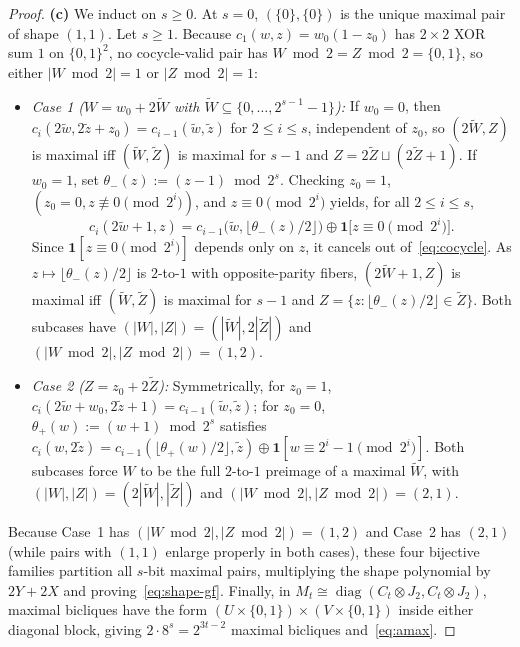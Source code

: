 \documentclass[11pt,reqno]{amsart}
\theoremstyle{definition}
\theoremstyle{remark}
\DeclareMathOperator{\diag}{diag}
\newcommand{\ind}{\mathbf{1}}
\numberwithin{equation}{section}
\begin{document}
\begin{proof}
\medskip
\noindent\textbf{(c)} We induct on $s \ge 0$. At $s = 0$, $(\{0\}, \{0\})$ is the unique maximal pair of shape $(1, 1)$. Let $s \ge 1$. Because $c_1(w, z) = w_0(1 - z_0)$ has $2 \times 2$ XOR sum $1$ on $\{0, 1\}^2$, no cocycle-valid pair has $W \bmod 2 = Z \bmod 2 = \{0, 1\}$, so either $|W \bmod 2| = 1$ or $|Z \bmod 2| = 1$:
\begin{itemize}[leftmargin=2em]
  \item \emph{Case 1 ($W = w_0 + 2\widetilde{W}$ with $\widetilde{W} \subseteq \{0, \dots, 2^{s-1} - 1\}$):}
  If $w_0 = 0$, then $c_i(2\tilde{w}, 2\tilde{z} + z_0) = c_{i-1}(\tilde{w}, \tilde{z})$ for $2 \le i \le s$, independent of $z_0$, so $(2\widetilde{W}, Z)$ is maximal iff $(\widetilde{W}, \widetilde{Z})$ is maximal for $s - 1$ and $Z = 2\widetilde{Z} \sqcup (2\widetilde{Z} + 1)$. If $w_0 = 1$, set $\theta_-(z) := (z - 1) \bmod 2^s$. Checking $z_0 = 1$, $(z_0 = 0, z \not\equiv 0 \pmod{2^i})$, and $z \equiv 0 \pmod{2^i}$ yields, for all $2 \le i \le s$,
  \[
    c_i(2\tilde{w} + 1, z) = c_{i-1}\bigl(\tilde{w}, \lfloor \theta_-(z)/2 \rfloor\bigr) \oplus \ind\bigl[z \equiv 0 \pmod{2^i}\bigr].
  \]
  Since $\ind[z \equiv 0 \pmod{2^i}]$ depends only on $z$, it cancels out of~\eqref{eq:cocycle}. As $z \mapsto \lfloor \theta_-(z)/2 \rfloor$ is $2$-to-$1$ with opposite-parity fibers, $(2\widetilde{W} + 1, Z)$ is maximal iff $(\widetilde{W}, \widetilde{Z})$ is maximal for $s - 1$ and $Z = \{z : \lfloor \theta_-(z)/2 \rfloor \in \widetilde{Z}\}$. Both subcases have $(|W|, |Z|) = (|\widetilde{W}|, 2|\widetilde{Z}|)$ and $(|W \bmod 2|, |Z \bmod 2|) = (1, 2)$.

  \item \emph{Case 2 ($Z = z_0 + 2\widetilde{Z}$):}
  Symmetrically, for $z_0 = 1$, $c_i(2\tilde{w} + w_0, 2\tilde{z} + 1) = c_{i-1}(\tilde{w}, \tilde{z})$; for $z_0 = 0$, $\theta_+(w) := (w + 1) \bmod 2^s$ satisfies $c_i(w, 2\tilde{z}) = c_{i-1}(\lfloor \theta_+(w)/2 \rfloor, \tilde{z}) \oplus \ind[w \equiv 2^i - 1 \pmod{2^i}]$. Both subcases force $W$ to be the full $2$-to-$1$ preimage of a maximal $\widetilde{W}$, with $(|W|, |Z|) = (2|\widetilde{W}|, |\widetilde{Z}|)$ and $(|W \bmod 2|, |Z \bmod 2|) = (2, 1)$.
\end{itemize}
Because Case~1 has $(|W \bmod 2|, |Z \bmod 2|) = (1, 2)$ and Case~2 has $(2, 1)$ (while pairs with $(1, 1)$ enlarge properly in both cases), these four bijective families partition all $s$-bit maximal pairs, multiplying the shape polynomial by $2Y + 2X$ and proving~\eqref{eq:shape-gf}. Finally, in $M_t \cong \diag(C_t \otimes J_2, C_t \otimes J_2)$, maximal bicliques have the form $(U \times \{0, 1\}) \times (V \times \{0, 1\})$ inside either diagonal block, giving $2 \cdot 8^s = 2^{3t-2}$ maximal bicliques and~\eqref{eq:amax}.
\end{proof}
\end{document}
